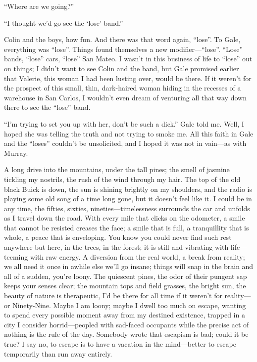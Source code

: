 ``Where are we going?''

``I thought we'd go see the `lose' band.''

Colin and the boys, how fun. And there was that word again, ``lose''. To
Gale, everything was ``lose''. Things found themselves a new
modifier---``lose''. ``Lose'' bands, ``lose'' cars, ``lose'' San Mateo.
I wasn't in this business of life to ``lose'' out on things; I didn't
want to see Colin and the band, but Gale promised earlier that Valerie,
this woman I had been lusting over, would be there. If it weren't for
the prospect of this small, thin, dark-haired woman hiding in the
recesses of a warehouse in San Carlos, I wouldn't even dream of
venturing all that way down there to see the ``lose'' band.

``I'm trying to set you up with her, don't be such a dick.'' Gale told
me. Well, I hoped she was telling the truth and not trying to smoke me.
All this faith in Gale and the ``loses'' couldn't be unsolicited, and I
hoped it was not in vain---as with Murray.

A long drive into the mountains, under the tall pines; the smell of
jasmine tickling my nostrils, the rush of the wind through my hair. The
top of the old black Buick is down, the sun is shining brightly on my
shoulders, and the radio is playing some old song of a time long gone,
but it doesn't feel like it. I could be in any time, the fifties,
sixties, nineties---timelessness surrounds the car and unfolds as I
travel down the road. With every mile that clicks on the odometer, a
smile that cannot be resisted creases the face; a smile that is full, a
tranquillity that is whole, a peace that is enveloping. You know you
could never find such rest anywhere but here, in the trees, in the
forest; it is still and vibrating with life---teeming with raw energy. A
diversion from the real world, a break from reality; we all need it once
in awhile else we'll go insane; things will snap in the brain and all of
a sudden, you're loony. The quiescent pines, the odor of their pungent
sap keeps your senses clear; the mountain tops and field grasses, the
bright sun, the beauty of nature is therapeutic, I'd be there for all
time if it weren't for reality---or Ninety-Nine. Maybe I am loony; maybe
I dwell too much on escape, wanting to spend every possible moment away
from my destined existence, trapped in a city I consider
horrid---peopled with sad-faced occupants while the precise act of
nothing is the rule of the day. Somebody wrote that escapism is bad;
could it be true? I say no, to escape is to have a vacation in the
mind---better to escape temporarily than run away entirely.

